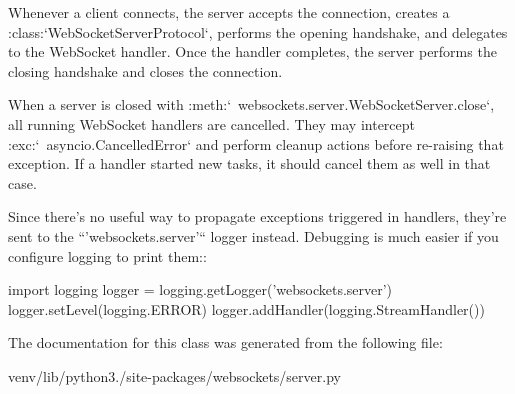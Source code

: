 \begin{DoxyVerb}
Whenever a client connects, the server accepts the connection, creates a
:class:`WebSocketServerProtocol`, performs the opening handshake, and
delegates to the WebSocket handler. Once the handler completes, the server
performs the closing handshake and closes the connection.

When a server is closed with
:meth:`~websockets.server.WebSocketServer.close`, all running WebSocket
handlers are cancelled. They may intercept :exc:`~asyncio.CancelledError`
and perform cleanup actions before re-raising that exception. If a handler
started new tasks, it should cancel them as well in that case.

Since there's no useful way to propagate exceptions triggered in handlers,
they're sent to the ``'websockets.server'`` logger instead. Debugging is
much easier if you configure logging to print them::

    import logging
    logger = logging.getLogger('websockets.server')
    logger.setLevel(logging.ERROR)
    logger.addHandler(logging.StreamHandler())\end{DoxyVerb}
 

The documentation for this class was generated from the following file\+:\begin{DoxyCompactItemize}
\item 
venv/lib/python3./site-\/packages/websockets/server.\+py\end{DoxyCompactItemize}
